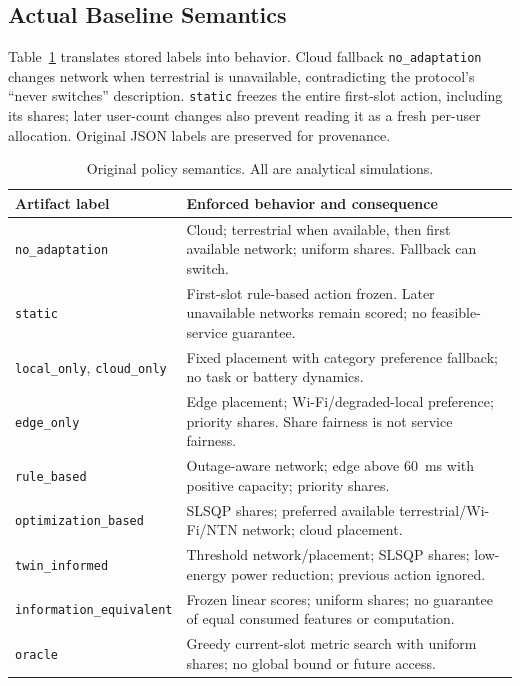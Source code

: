 \documentclass[letterpaper,journal]{IEEEtran}
\newcommand{\pol}[1]{\texttt{#1}}
\begin{document}
\subsection{Actual Baseline Semantics}
Table~\ref{tab:semantics} translates stored labels into behavior. Cloud fallback \pol{no\_adaptation} changes network when terrestrial is unavailable, contradicting the protocol's ``never switches'' description. \pol{static} freezes the entire first-slot action, including its shares; later user-count changes also prevent reading it as a fresh per-user allocation. Original JSON labels are preserved for provenance.
\begin{table}[t]
\caption{Original policy semantics. All are analytical simulations.}\label{tab:semantics}
\centering\small
\begin{tabular}{p{}p{}}
\toprule Artifact label & Enforced behavior and consequence \\
\midrule
\pol{no\_adaptation} & Cloud; terrestrial when available, then first available network; uniform shares. Fallback can switch. \\
\pol{static} & First-slot rule-based action frozen. Later unavailable networks remain scored; no feasible-service guarantee. \\
\pol{local\_only}, \pol{cloud\_only} & Fixed placement with category preference fallback; no task or battery dynamics. \\
\pol{edge\_only} & Edge placement; Wi-Fi/degraded-local preference; priority shares. Share fairness is not service fairness. \\
\pol{rule\_based} & Outage-aware network; edge above 60~ms with positive capacity; priority shares. \\
\pol{optimization\_based} & SLSQP shares; preferred available terrestrial/Wi-Fi/NTN network; cloud placement. \\
\pol{twin\_informed} & Threshold network/placement; SLSQP shares; low-energy power reduction; previous action ignored. \\
\pol{information\_equivalent} & Frozen linear scores; uniform shares; no guarantee of equal consumed features or computation. \\
\pol{oracle} & Greedy current-slot metric search with uniform shares; no global bound or future access. \\
\bottomrule\end{tabular}
\end{table}
\end{document}
